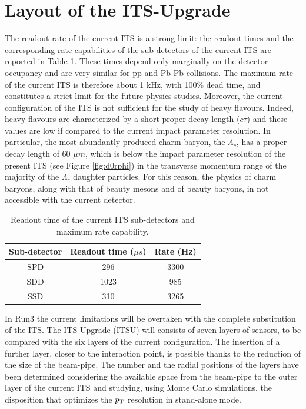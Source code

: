 \section{Layout of the ITS-Upgrade}
The readout rate of the current ITS is a strong limit: the readout times and the corresponding rate capabilities of the sub-detectors of the current ITS are reported in Table \ref{tab:curr}. These times depend only marginally on the detector occupancy and are very similar for pp and Pb-Pb collisions. The maximum rate of the current ITS is therefore about 1 kHz, with 100\% dead time, and constitutes a strict limit for the future physics studies. Moreover, the current configuration of the ITS is not sufficient for the study of heavy flavours. Indeed, heavy flavours are characterized by a short proper decay length ($c\tau$) and these values are low if compared to the current impact parameter resolution. In particular, the most abundantly produced charm baryon, the $\Lambda_{c}$, has a proper decay length of 60 $\mu m$, which is below the impact parameter resolution of the present ITS (see Figure \ref{fig:d0rphi}) in the transverse momentum range of the majority of the $\Lambda_{c}$ daughter particles. For this reason, the physics of charm baryons, along with that of beauty mesons and of beauty baryons, in not accessible with the current detector.\\
%
\begin{table}
\centering
\renewcommand\arraystretch{1.5}
 \begin{tabular}{|c|c|c|}
  \hline
  Sub-detector & Readout time ($\mu s$) & Rate (Hz)\\
  \hline
  SPD & 296 & 3300 \\
  SDD & 1023 & 985 \\
  SSD & 310 & 3265 \\
  \hline
 \end{tabular}
 \caption{Readout time of the current ITS sub-detectors and maximum rate capability.}
 \label{tab:curr}
\end{table}
%
In Run3 the current limitations will be overtaken with the complete substitution of the ITS. The ITS-Upgrade (ITSU) will consists of seven layers of sensors, to be compared with the six layers of the current configuration. The insertion of a further layer, closer to the interaction point, is possible thanks to the reduction of the size of the beam-pipe. The number and the radial positions of the layers have been determined considering the available space from the beam-pipe to the outer layer of the current ITS and studying, using Monte Carlo simulations, the disposition that optimizes the $p_\text{T}$ resolution in stand-alone mode.\\

